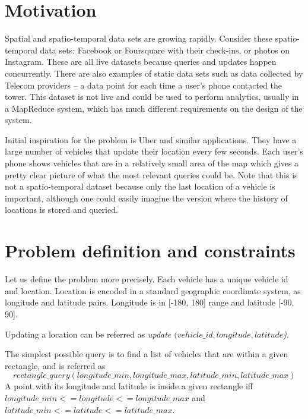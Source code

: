 \documentclass[times, utf8, diplomski]{fer}
\begin{document}

\section{Motivation}
Spatial and spatio-temporal data sets are growing rapidly. Consider these spatio-temporal data sets: Facebook or Foursquare with their check-ins, or photos on Instagram. These are all live datasets because queries and updates happen concurrently. There are also examples of static data sets such as data collected by Telecom providers -- a data point for each time a user's phone contacted the tower. This dataset is not live and could be used to perform analytics, usually in a MapReduce system, which has much different requirements on the design of the system.

Initial inspiration for the problem is Uber and similar applications. They have a large number of vehicles that update their location every few seconds. Each user's phone shows vehicles that are in a relatively small area of the map which gives a pretty clear picture of what the most relevant queries could be. Note that this is not a spatio-temporal dataset because only the last location of a vehicle is important, although one could easily imagine the version where the history of locations is stored and queried.

\section{Problem definition and constraints}
Let us define the problem more precisely. Each vehicle has a unique vehicle id and location. Location is encoded in a standard geographic coordinate system, as longitude and latitude pairs. Longitude is in [-180, 180] range and latitude [-90, 90].

Updating a location can be referred as \emph{update $(vehicle\_id, longitude, latitude$)}.

The simplest possible query is to find a list of vehicles that are within a given rectangle, and is referred as
$$rectangle\_query (longitude\_min, longitude\_max, latitude\_min, latitude\_max)$$
A point with its longitude and latitude is inside a given rectangle iff $longitude\_min <= longitude <= longitude\_max$ and $latitude\_min <= latitude <= latitude\_max$.
\end{document}
